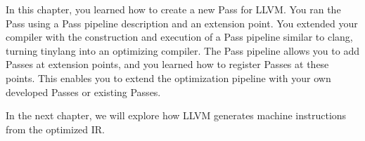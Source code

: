 In this chapter, you learned how to create a new Pass for LLVM. You ran the Pass using a Pass pipeline description and an extension point. You extended your compiler with the construction and execution of a Pass pipeline similar to clang, turning tinylang into an optimizing compiler. The Pass pipeline allows you to add Passes at extension points, and you learned how to register Passes at these points. This enables you to extend the optimization pipeline with your own developed Passes or existing Passes.\par

In the next chapter, we will explore how LLVM generates machine instructions from the optimized IR.\par
